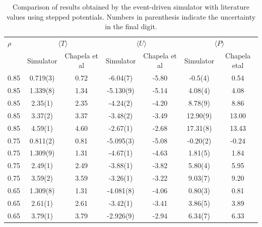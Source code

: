 \documentclass[12pt]{UoAthesis}
\begin{document}
\begin{table} 
  \caption{Comparison of results
    obtained by the event-driven simulator with literature values
    using stepped potentials. Numbers in parenthesis indicate the
    uncertainty in the final digit.
\label{tab:benchsoft}} 
  \begin{center} 
    \begin{tabular}{l c c c c c c} 
      \toprule
      $\rho$ & \multicolumn{2}{c}{$\langle T\rangle$} &
      \multicolumn{2}{c}{$\langle U \rangle$} &
      \multicolumn{2}{c}{$\langle P \rangle$}
      \\ \cmidrule(rl{0.75em}){2-3} \cmidrule(rl{0.75em}){4-5}
      \cmidrule(rl{0.75em}){6-7}& Simulator & Chapela et al &
      Simulator & Chapela et al & Simulator & Chapela etal\\ 
      \midrule
      0.85 & 0.719(3) & 0.72 & -6.04(7) & -5.80 & -0.5(4) & 0.54
      \\ 0.85& 1.339(8) & 1.34 & -5.130(9) & -5.14 & 4.08(4) & 4.08
      \\ 0.85 & 2.35(1) & 2.35 & -4.24(2) & -4.20 & 8.78(9) & 8.86
      \\ 0.85 & 3.37(2) & 3.37 & -3.48(2) & -3.49 & 12.90(9) & 13.00
      \\ 0.85 & 4.59(1) & 4.60 & -2.67(1) & -2.68 & 17.31(8) & 13.43
      \\ 0.75 & 0.811(2) & 0.81 & -5.095(3) & -5.08 & -0.20(2) & -0.24
      \\ 0.75 &1.309(9) & 1.31 & -4.67(1) & -4.63 & 1.81(5) & 1.84
      \\ 0.75 & 2.49(1) & 2.49 & -3.88(1) & -3.82 & 5.80(4) & 5.95
      \\ 0.75 & 3.59(2) & 3.59 & -3.26(1) & -3.22 & 9.03(7) & 9.20
      \\ 0.65 & 1.309(8) & 1.31 & -4.081(8) & -4.06 & 0.80(3) & 0.81
      \\0.65 & 2.61(1) & 2.61 & -3.42(1) & -3.41 & 3.86(5) & 3.89
      \\ 0.65 & 3.79(1) & 3.79 & -2.926(9) & -2.94 & 6.34(7) & 6.33
      \\ 
      \bottomrule 
    \end{tabular}
\end{center} 
\end{table} 

\end{document}
